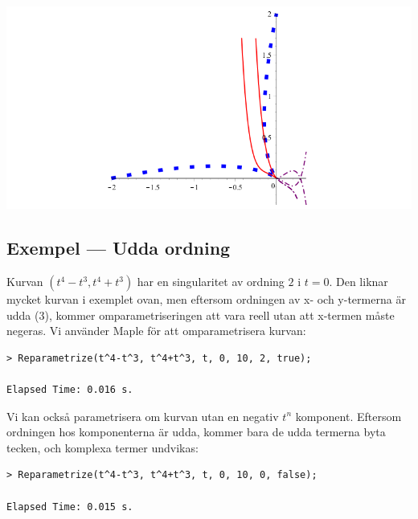 \begin{center}
\includegraphics[scale=0.35]{Export/kurvorplot2d4.png}
\end{center}

\subsection{Exempel --- Udda ordning}

Kurvan $\left(t^4 - t^3,t^4 + t^3\right)$ har en singularitet av ordning $2$ i $t = 0$. Den liknar mycket kurvan i exemplet ovan, men eftersom ordningen av x- och y-termerna är udda ($3$), kommer omparametriseringen att vara reell utan att x-termen måste negeras. Vi använder Maple för att omparametrisera kurvan:

\begin{maplegroup}
\begin{verbatim}
> Reparametrize(t^4-t^3, t^4+t^3, t, 0, 10, 2, true);

Elapsed Time: 0.016 s.
\end{verbatim}
\mapleresult
\begin{maplelatex}
\end{maplelatex}
\end{maplegroup}

\vspace{20pt}
Vi kan också parametrisera om kurvan utan en negativ $t^n$ komponent. Eftersom ordningen hos komponenterna är udda, kommer bara de udda termerna byta tecken, och komplexa termer undvikas: 

\begin{maplegroup}
\begin{verbatim}
> Reparametrize(t^4-t^3, t^4+t^3, t, 0, 10, 0, false);

Elapsed Time: 0.015 s.
\end{verbatim}
\mapleresult
\begin{maplelatex}
\end{maplelatex}
\end{maplegroup}

